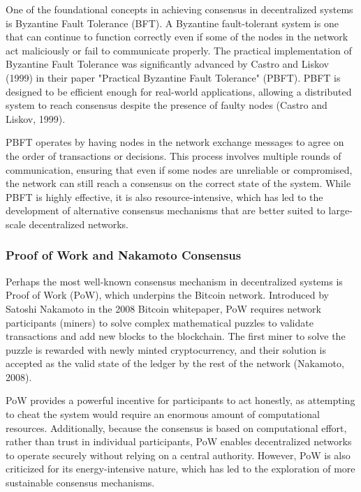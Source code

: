 \documentclass[12pt,twoside]{article}
\begin{document}
One of the foundational concepts in achieving consensus in decentralized systems is Byzantine Fault Tolerance (BFT). A Byzantine fault-tolerant system is one that can continue to function correctly even if some of the nodes in the network act maliciously or fail to communicate properly. The practical implementation of Byzantine Fault Tolerance was significantly advanced by Castro and Liskov (1999) in their paper "Practical Byzantine Fault Tolerance" (PBFT). PBFT is designed to be efficient enough for real-world applications, allowing a distributed system to reach consensus despite the presence of faulty nodes (Castro and Liskov, 1999).

PBFT operates by having nodes in the network exchange messages to agree on the order of transactions or decisions. This process involves multiple rounds of communication, ensuring that even if some nodes are unreliable or compromised, the network can still reach a consensus on the correct state of the system. While PBFT is highly effective, it is also resource-intensive, which has led to the development of alternative consensus mechanisms that are better suited to large-scale decentralized networks.

\subsubsection{Proof of Work and Nakamoto Consensus}

Perhaps the most well-known consensus mechanism in decentralized systems is Proof of Work (PoW), which underpins the Bitcoin network. Introduced by Satoshi Nakamoto in the 2008 Bitcoin whitepaper, PoW requires network participants (miners) to solve complex mathematical puzzles to validate transactions and add new blocks to the blockchain. The first miner to solve the puzzle is rewarded with newly minted cryptocurrency, and their solution is accepted as the valid state of the ledger by the rest of the network (Nakamoto, 2008).

PoW provides a powerful incentive for participants to act honestly, as attempting to cheat the system would require an enormous amount of computational resources. Additionally, because the consensus is based on computational effort, rather than trust in individual participants, PoW enables decentralized networks to operate securely without relying on a central authority. However, PoW is also criticized for its energy-intensive nature, which has led to the exploration of more sustainable consensus mechanisms.
\end{document}
